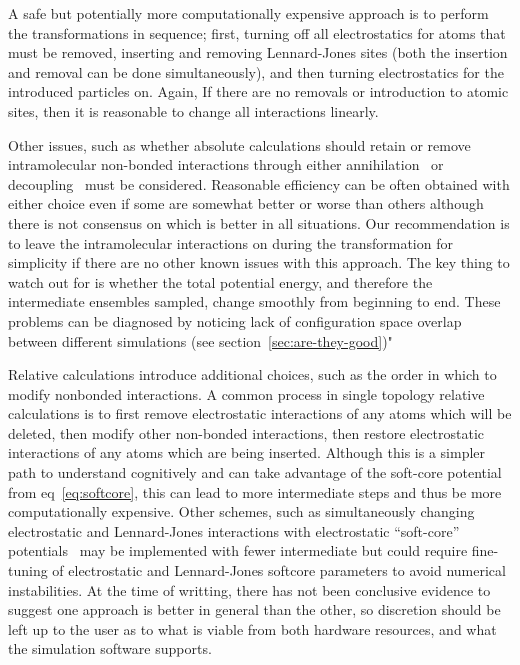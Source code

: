 \documentclass[9pt,bestpractices]{livecoms}
\begin{document}
A safe but potentially more computationally expensive approach is to perform the transformations in sequence; first, turning off all electrostatics for atoms that must be removed, inserting and removing Lennard-Jones sites (both the insertion and removal can be done simultaneously), and then turning electrostatics for the introduced particles on. Again, If there are no removals or introduction to atomic sites, then it is reasonable to change all interactions linearly. 

Other issues, such as whether absolute calculations should retain or remove intramolecular non-bonded interactions
through either annihilation~\cite{hermans1997inclusion, mann2000modeling, boresch2003absolute, wang2006absoulte, mobley2006use} or decoupling~\cite{fujitani2005direct, mobley2006use} must be considered. Reasonable efficiency can be often obtained with either choice even if some are somewhat better or worse than others although there is not consensus on which is better in all situations. Our recommendation is to leave the intramolecular interactions on during the transformation for simplicity if there are no other known issues with this approach.  The key thing to watch out for is whether the total potential energy, and therefore the intermediate ensembles sampled, change smoothly from beginning to end. These problems can be diagnosed by noticing lack of configuration space overlap between different simulations (see section~\ref{sec:are-they-good})" 

Relative calculations introduce additional choices, such as the order in which to modify nonbonded interactions.
A common process in single topology relative calculations is to first remove electrostatic interactions of any atoms which will be deleted, then modify other non-bonded interactions, then restore electrostatic interactions of any atoms which are being inserted. Although this is a simpler path to understand cognitively and can take advantage of the soft-core potential from eq~\ref{eq:softcore}, this can lead to more intermediate steps and thus be more computationally expensive.
Other schemes, such as simultaneously changing electrostatic and Lennard-Jones interactions with electrostatic ``soft-core'' potentials~\cite{steinbrecher2007nonlinear} may be implemented with fewer intermediate but could require fine-tuning of electrostatic and Lennard-Jones softcore parameters to avoid numerical instabilities. 
At the time of writting, there has not been conclusive evidence to suggest one approach is better in general than the other, so discretion should be left up to the user as to what is viable from both hardware resources, and what the simulation software supports.
\end{document}
